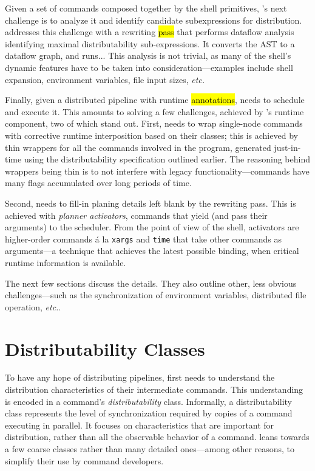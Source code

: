 \documentclass[sigplan,10pt,review,anonymous]{acmart}
\newcommand{\etc}{{\em etc.}\xspace}
\newcommand{\ttt}[1]{\texttt{\small #1}}
\newcommand{\todo}[1]{\hl{#1}\xspace}
\begin{document}
Given a set of commands composed together by the shell primitives, \sys's next challenge is to analyze it and identify candidate subexpressions for distribution.
\sys addresses this challenge with a rewriting \todo{pass} that performs dataflow analysis identifying maximal distributability sub-expressions.
It converts the AST to a dataflow graph, and runs...
This analysis is not trivial, as many of the shell's dynamic features have to be taken into consideration---examples include shell expansion, environment variables, file input sizes, \etc

Finally, given a distributed pipeline with runtime \todo{annotations}, \sys needs to schedule and execute it.
This amounts to solving a few challenges, achieved by \sys's runtime component, two of which stand out.
First, \sys needs to wrap single-node commands with corrective runtime interposition based on their classes;
  this is achieved by thin wrappers for all the commands involved in the program, generated just-in-time using the distributability specification outlined earlier.
The reasoning behind wrappers being thin is to not interfere with legacy functionality---commands have many flags accumulated over long periods of time.

Second, \sys needs to fill-in planing details left blank by the rewriting pass.
This is achieved with \emph{planner activators}, commands that yield (and pass their arguments) to the scheduler.
From the point of view of the shell, activators are higher-order commands \'{a} la \ttt{xargs} and \ttt{time} that take other commands as arguments---a technique that achieves the latest possible binding, when critical runtime information is available.

The next few sections discuss the details.
They also outline other, less obvious challenges---such as the synchronization of environment variables, distributed file operation, \etc.


\section{Distributability Classes}
\label{distributability}

To have any hope of distributing \unix pipelines, \sys first needs to understand the distribution characteristics of their intermediate commands.
This understanding is encoded in a command's \emph{distributability} class.
Informally, a distributability class represents the level of synchronization required by copies of a command executing in parallel.
It focuses on characteristics that are important for distribution, rather than all the observable behavior of a command.
\sys leans towards a few coarse classes rather than many detailed ones---among other reasons, to simplify their use by command developers.
\end{document}
